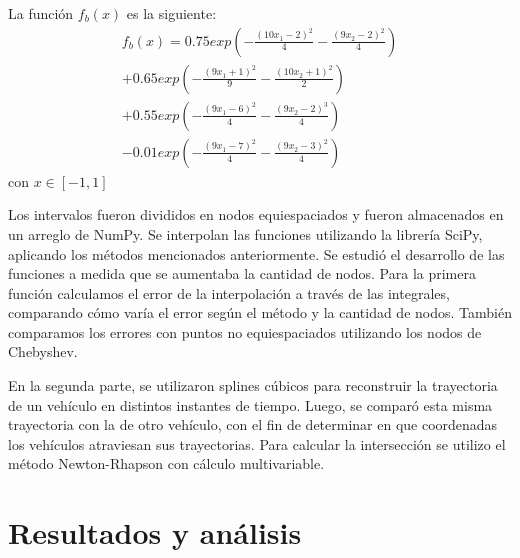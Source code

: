\documentclass[12pt,a4]{article} %
\begin{document}
\begin{multicols}{2}
La función $f_b(x)$ es la siguiente:
\begin{multline*}  
    f_b(x) = 0.75exp\left(-\frac{(10x_1-2)^2}{4}-\frac{(9x_2-2)^2}{4}\right)\\
+0.65exp\left(-\frac{(9x_1+1)^2}{9}-\frac{(10x_2+1)^2}{2}\right)\\
+0.55exp\left(-\frac{(9x_1-6)^2}{4}-\frac{(9x_2-2)^3}{4}\right)\\
-0.01exp\left(-\frac{(9x_1-7)^2}{4}-\frac{(9x_2-3)^2}{4}\right)
\label{$f_a(x)$}
\end{multline*}
\hspace{6mm}con $x\in[-1,1]$


Los intervalos fueron divididos en nodos equiespaciados y fueron almacenados en un arreglo de NumPy. Se interpolan las funciones utilizando la librería SciPy, aplicando los métodos mencionados anteriormente.
Se estudió el desarrollo de las funciones a medida que se aumentaba la cantidad de nodos.
Para la primera función calculamos el error de la interpolación a través de las integrales, comparando cómo varía el error según el método y la cantidad de nodos. También comparamos los errores con puntos no equiespaciados utilizando los nodos de Chebyshev.

En la segunda parte, se utilizaron splines cúbicos para reconstruir la trayectoria de un vehículo en distintos instantes de tiempo. Luego, se comparó esta misma trayectoria con la de otro vehículo, con el fin de determinar en que coordenadas los vehículos atraviesan sus trayectorias. Para calcular la intersección se utilizo el método Newton-Rhapson con cálculo multivariable. 

\section{Resultados y análisis}


\end{multicols}
\end{document}
